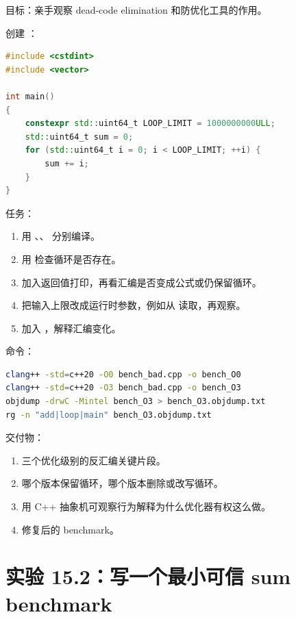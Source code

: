 \begin{labbox}
目标：亲手观察 dead-code elimination 和防优化工具的作用。

创建 ：

\begin{lstlisting}[language=C++]
#include <cstdint>
#include <vector>

int main()
{
    constexpr std::uint64_t LOOP_LIMIT = 1000000000ULL;
    std::uint64_t sum = 0;
    for (std::uint64_t i = 0; i < LOOP_LIMIT; ++i) {
        sum += i;
    }
}
\end{lstlisting}

任务：

\begin{enumerate}
  \item 用 、、 分别编译。
  \item 用  检查循环是否存在。
  \item 加入返回值打印，再看汇编是否变成公式或仍保留循环。
  \item 把输入上限改成运行时参数，例如从  读取，再观察。
  \item 加入 ，解释汇编变化。
\end{enumerate}

命令：

\begin{lstlisting}[language=bash]
clang++ -std=c++20 -O0 bench_bad.cpp -o bench_O0
clang++ -std=c++20 -O3 bench_bad.cpp -o bench_O3
objdump -drwC -Mintel bench_O3 > bench_O3.objdump.txt
rg -n "add|loop|main" bench_O3.objdump.txt
\end{lstlisting}

交付物：

\begin{enumerate}
  \item 三个优化级别的反汇编关键片段。
  \item 哪个版本保留循环，哪个版本删除或改写循环。
  \item 用 C++ 抽象机可观察行为解释为什么优化器有权这么做。
  \item 修复后的 benchmark。
\end{enumerate}
\end{labbox}

\section{实验 15.2：写一个最小可信 sum benchmark}

